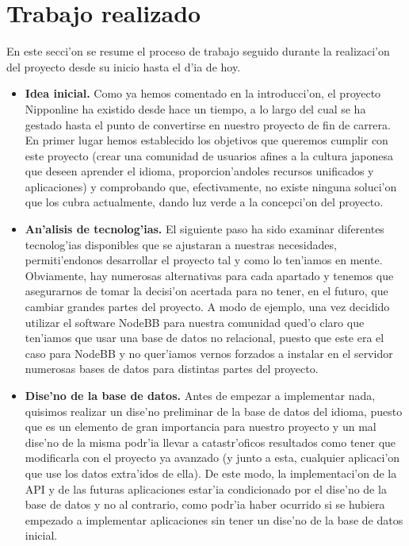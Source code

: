 \section{Trabajo realizado}
\label{sub:trabajo_realizado}

En este secci'on se resume el proceso de trabajo seguido durante la realizaci'on del proyecto desde su inicio hasta
el d'ia de hoy.

\begin{itemize}
\item \textbf{Idea inicial.} Como ya hemos comentado en la introducci'on, el proyecto Nipponline ha existido desde
hace un tiempo, a lo largo del cual se ha gestado hasta el punto de convertirse en nuestro proyecto de fin de carrera.
En primer lugar hemos establecido los objetivos que queremos cumplir con este proyecto (crear una comunidad de
usuarios afines a la cultura japonesa que deseen aprender el idioma, proporcion'andoles recursos unificados y
aplicaciones) y comprobando que, efectivamente, no existe ninguna soluci'on que los cubra actualmente, dando luz
verde a la concepci'on del proyecto.
\item \textbf{An'alisis de tecnolog'ias.} El siguiente paso ha sido examinar diferentes tecnolog'ias disponibles que
se ajustaran a nuestras necesidades, permiti'endonos desarrollar el proyecto tal y como lo ten'iamos en mente. 
Obviamente, hay numerosas alternativas para cada apartado y tenemos que asegurarnos de tomar la decisi'on acertada
para no tener, en el futuro, que cambiar grandes partes del proyecto. A modo de ejemplo, una vez decidido utilizar el
software NodeBB para nuestra comunidad qued'o claro que ten'iamos que usar una base de datos no relacional, puesto
que este era el caso para NodeBB y no quer'iamos vernos forzados a instalar en el servidor numerosas bases de datos
para distintas partes del proyecto.
\item \textbf{Dise'no de la base de datos.} Antes de empezar a implementar nada, quisimos realizar un dise'no
preliminar de la base de datos del idioma, puesto que es un elemento de gran importancia para nuestro proyecto y un
mal dise'no de la misma podr'ia llevar a catastr'oficos resultados como tener que modificarla con el proyecto ya
avanzado (y junto a esta, cualquier aplicaci'on que use los datos extra'idos de ella).
De este modo, la implementaci'on de la API y de las futuras aplicaciones estar'ia condicionado por el dise'no de la
base de datos y no al contrario, como podr'ia haber ocurrido si se hubiera empezado a implementar aplicaciones sin
tener un dise'no de la base de datos inicial.

\end{itemize}
